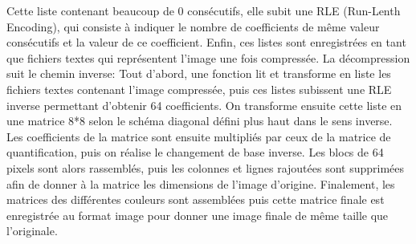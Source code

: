 \documentclass[12pt]{article}
\begin{document}
Cette liste contenant beaucoup de 0 consécutifs, elle subit une RLE (Run-Lenth Encoding), qui consiste à indiquer le nombre de coefficients de même valeur consécutifs et la valeur de ce coefficient. Enfin, ces listes sont enregistrées en tant que fichiers textes qui représentent l’image une fois compressée.
\newline
La décompression suit le chemin inverse: 
\newline
Tout d’abord, une fonction lit et transforme en liste les fichiers textes contenant l’image compressée, puis ces listes subissent une RLE inverse permettant d’obtenir 64 coefficients. 
On transforme ensuite cette liste en une matrice 8*8 selon le schéma diagonal défini plus haut dans le sens inverse. Les coefficients de la matrice sont ensuite multipliés par ceux de la matrice de quantification, puis on réalise le changement de base inverse. Les blocs de 64 pixels sont alors rassemblés, puis les colonnes et lignes rajoutées sont supprimées afin de donner à la matrice les dimensions de l’image d’origine. 
\newline
Finalement, les matrices des différentes couleurs sont assemblées puis cette matrice finale est enregistrée au format image pour donner une image finale de même taille que l’originale.
\newpage
\end{document}

